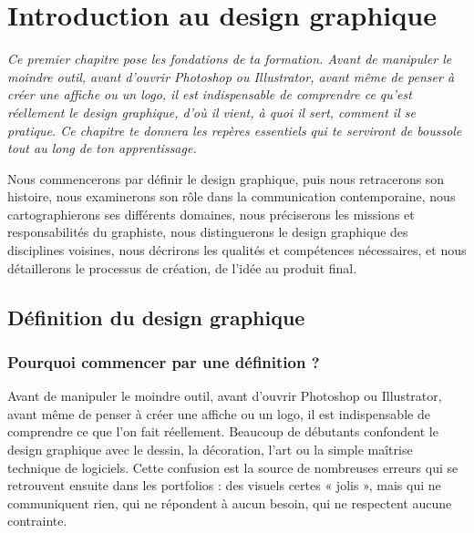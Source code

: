 
\chapter{Introduction au design graphique}

\noindent
\textit{Ce premier chapitre pose les fondations de ta formation. Avant de manipuler le moindre outil, avant d'ouvrir Photoshop ou Illustrator, avant même de penser à créer une affiche ou un logo, il est indispensable de comprendre ce qu'est réellement le design graphique, d'où il vient, à quoi il sert, comment il se pratique. Ce chapitre te donnera les repères essentiels qui te serviront de boussole tout au long de ton apprentissage.}

\vspace{1em}

\noindent
Nous commencerons par définir le design graphique, puis nous retracerons son histoire, nous examinerons son rôle dans la communication contemporaine, nous cartographierons ses différents domaines, nous préciserons les missions et responsabilités du graphiste, nous distinguerons le design graphique des disciplines voisines, nous décrirons les qualités et compétences nécessaires, et nous détaillerons le processus de création, de l'idée au produit final.

\section{Définition du design graphique}

\subsection{Pourquoi commencer par une définition ?}

Avant de manipuler le moindre outil, avant d'ouvrir Photoshop ou Illustrator, avant même de penser à créer une affiche ou un logo, il est indispensable de comprendre ce que l'on fait réellement. Beaucoup de débutants confondent le design graphique avec le dessin, la décoration, l'art ou la simple maîtrise technique de logiciels. Cette confusion est la source de nombreuses erreurs qui se retrouvent ensuite dans les portfolios : des visuels certes « jolis », mais qui ne communiquent rien, qui ne répondent à aucun besoin, qui ne respectent aucune contrainte.

